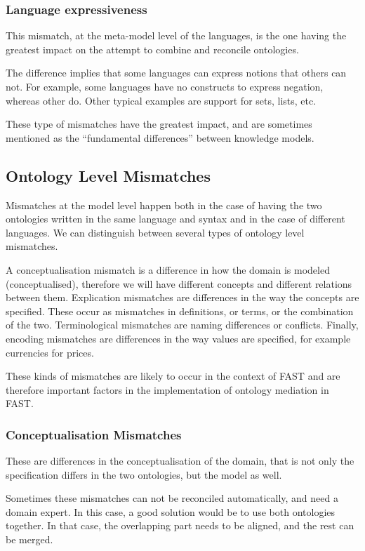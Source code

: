 \subsubsection{Language expressiveness}
This mismatch, at the meta-model level of the languages, is the one
having the greatest impact on the attempt to combine and reconcile
ontologies. 

The difference implies that some languages can express notions that
others can not. For example, some languages have no constructs to
express negation, whereas other do. Other typical examples are support
for sets, lists, etc. 

These type of mismatches have the greatest impact, and are sometimes
mentioned as the {\textquotedblleft}fundamental
differences{\textquotedblright} between knowledge models. 

\subsection{Ontology Level Mismatches}
\label{subsec:ontologymismatches_ontologylevel}
Mismatches at the model level happen both in the case of having the two
ontologies written in the same language and syntax and in the case of
different languages. We can distinguish between several types of
ontology level mismatches. 

A conceptualisation mismatch is a difference in how the domain is
modeled (conceptualised), therefore we will have different concepts and
different relations between them. Explication mismatches are
differences in the way the concepts are specified. These occur as
mismatches in definitions, or terms, or the combination of the two.
Terminological mismatches are naming differences or conflicts. Finally,
encoding mismatches are differences in the way values are specified,
for example currencies for prices. 

These kinds of mismatches are likely to occur in the context of FAST and
are therefore important factors in the implementation of ontology
mediation in FAST. 

\subsubsection{Conceptualisation Mismatches}
These are differences in the conceptualisation of the domain, that is
not only the specification differs in the two ontologies, but the model
as well. 

Sometimes these mismatches can not be reconciled automatically, and need
a domain expert. In this case, a good solution would be to use both
ontologies together. In that case, the overlapping part needs to be
aligned, and the rest can be merged. 

